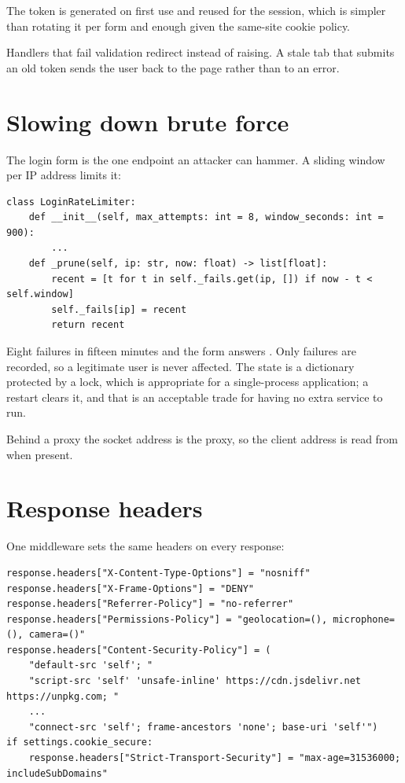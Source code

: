 The token is generated on first use and reused for the session, which is simpler
than rotating it per form and enough given the same-site cookie policy.

Handlers that fail validation redirect instead of raising. A stale tab that
submits an old token sends the user back to the page rather than to an error.

\section{Slowing down brute force}

The login form is the one endpoint an attacker can hammer. A sliding window per
IP address limits it:

\begin{lstlisting}[style=py]
class LoginRateLimiter:
    def __init__(self, max_attempts: int = 8, window_seconds: int = 900):
        ...
    def _prune(self, ip: str, now: float) -> list[float]:
        recent = [t for t in self._fails.get(ip, []) if now - t < self.window]
        self._fails[ip] = recent
        return recent
\end{lstlisting}

Eight failures in fifteen minutes and the form answers . Only failures
are recorded, so a legitimate user is never affected. The state is a dictionary
protected by a lock, which is appropriate for a single-process application; a
restart clears it, and that is an acceptable trade for having no extra service
to run.

Behind a proxy the socket address is the proxy, so the client address is read
from  when present.

\section{Response headers}

One middleware sets the same headers on every response:

\begin{lstlisting}[style=py]
response.headers["X-Content-Type-Options"] = "nosniff"
response.headers["X-Frame-Options"] = "DENY"
response.headers["Referrer-Policy"] = "no-referrer"
response.headers["Permissions-Policy"] = "geolocation=(), microphone=(), camera=()"
response.headers["Content-Security-Policy"] = (
    "default-src 'self'; "
    "script-src 'self' 'unsafe-inline' https://cdn.jsdelivr.net https://unpkg.com; "
    ...
    "connect-src 'self'; frame-ancestors 'none'; base-uri 'self'")
if settings.cookie_secure:
    response.headers["Strict-Transport-Security"] = "max-age=31536000; includeSubDomains"
\end{lstlisting}

